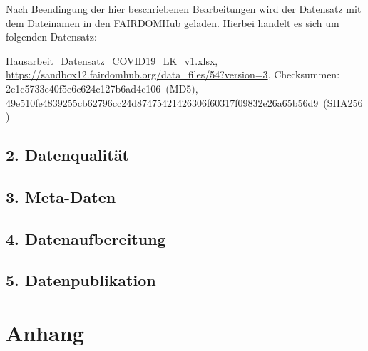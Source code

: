 \documentclass[12pt,a4paper,toc=bibliographynumbered,toc=indenttextentries]{scrreprt}
\begin{document}
		Nach Beendingung der hier beschriebenen Bearbeitungen wird der Datensatz mit dem Dateinamen in den FAIRDOMHub geladen. Hierbei handelt es sich um folgenden Datensatz:\par
		\textsf{Hausarbeit\_Datensatz\_COVID19\_LK\_v1.xlsx,  \url{https://sandbox12.fairdomhub.org/data_files/54?version=3}, Checksummen: 2c1c5733e40f5e6c624c127b6ad4c106~(MD5), 49e510fe4839255cb62796cc24d87475421426306f60317f09832e26a65b56d9~(SHA256)} 
		 
	
		\section*{2. Datenqualität}
	
		\section*{3. Meta-Daten}
	
		\section*{4. Datenaufbereitung}
	
		\section*{5. Datenpublikation}
	
	\clearpage
	\singlespacing
	
	\clearpage
				
	\chapter{Anhang}
	
\end{document}
